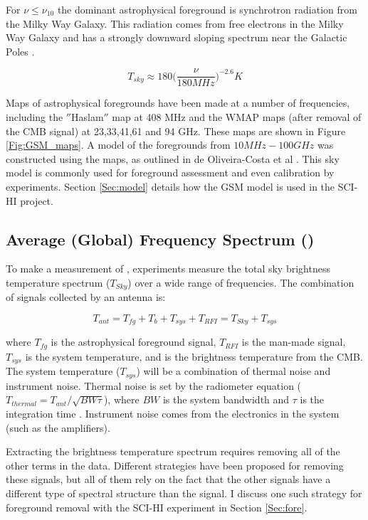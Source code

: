 For $\nu \leq \nu_{10}$ the dominant astrophysical foreground is synchrotron radiation from the Milky Way Galaxy. This radiation comes from free electrons in the Milky Way Galaxy and has a strongly downward sloping spectrum near the Galactic Poles \cite{furlanetto_2006}. 

\begin{equation}\label{Eq:T_sky}
T_{sky} \approx 180 \Big( \frac{\nu}{180 MHz} \Big)^{-2.6} K
\end{equation}

Maps of astrophysical foregrounds have been made at a number of frequencies, including the $''$Haslam$''$ map at 408 MHz and the WMAP maps (after removal of the CMB signal) at 23,33,41,61 and 94 GHz. These maps are shown in Figure \ref{Fig:GSM_maps}. A model of the foregrounds from $10 MHz-100 GHz$ was constructed using the maps, as outlined in de Oliveira-Costa et al \cite{GSM_model}. This sky model is commonly used for foreground assessment and even calibration by \cm experiments. Section \ref{Sec:model} details how the GSM model is used in the SCI-HI project.


\subsection{Average (Global) Frequency Spectrum (\avgdtb)} \label{Sec:avgdtb}

To make a measurement of \avgdtb, experiments measure the total sky brightness temperature spectrum ($T_{Sky}$) over a wide range of frequencies. The combination of signals collected by an antenna is: 

\begin{equation}
T_{ant} = T_{fg} + T_b +T_{sys}+T_{RFI} = T_{Sky} + T_{sys}
\end{equation}

where $T_{fg}$ is the astrophysical foreground signal, $T_{RFI}$ is the man-made signal, $T_{sys}$ is the system temperature, and \tb is the brightness temperature from the CMB. The system temperature ($T_{sys}$) will be a combination of thermal noise and instrument noise. Thermal noise is set by the radiometer equation ($T_{thermal} = T_{ant}/\sqrt{BW \tau}$), where $BW$ is the system bandwidth and $\tau$ is the integration time \cite{carroll2007}. Instrument noise comes from the electronics in the system (such as the amplifiers). 

Extracting the \cm brightness temperature spectrum requires removing all of the other terms in the data. Different strategies have been proposed for removing these signals, but all of them rely on the fact that the other signals have a different type of spectral structure than the \cm signal. I discuss one such strategy for foreground removal with the SCI-HI experiment in Section \ref{Sec:fore}. 


